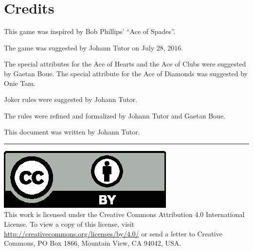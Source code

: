 \documentclass{article}
\begin{document}
\newpage
\section{Credits}

This game was inspired by Bob Phillips' ``Ace of Spades''.

The game was suggested by Johann Tutor on July 28, 2016.

The special attributes for the Ace of Hearts and the Ace of Clubs were
suggested by Gaetan Boue. The special attribute for the Ace of Diamonds
was suggested by Onie Tam.

Joker rules were suggested by Johann Tutor.

The rules were refined and formalized by Johann Tutor and Gaetan Boue.

This document was written by Johann Tutor.

\medskip
\hrule

{
  \small
  \includegraphics[scale=0.5]{cc-by.eps}\\
  This work is licensed under the Creative Commons Attribution 4.0
  International License. To view a copy of this license, visit
  \url{http://creativecommons.org/licenses/by/4.0/} or send a letter to Creative Commons, PO Box 1866, Mountain View, CA 94042, USA.
}
\end{document}
